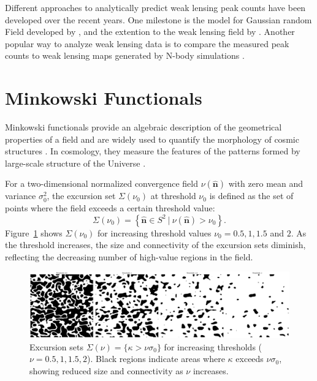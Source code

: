 Different approaches to analytically predict weak lensing peak counts have been developed over the recent years. One milestone is the model for Gaussian random Field developed by \citet{1986ApJ...304...15B}, and the extention to the weak lensing field by \citet{2010A&A...519A..23M}. Another popular way to analyze weak lensing data is to compare the measured peak counts to weak lensing maps generated by N-body simulations \citep{2010PhRvD..81h3505M, 2016MNRAS.463.3653K, 2018MNRAS.474..712M, 2021JCAP...01..028Z}.

\section{Minkowski Functionals}
\label{sec:minkowski_functionals}
Minkowski functionals provide an algebraic description of the geometrical properties of a field and are widely used to quantify the morphology of cosmic structures \citep{1994A&A...288..697M}. In cosmology,  they measure the features of the patterns formed by large-scale structure of the Universe \citep{1996dmu..conf..281S, 1997ApJ...482L...1S}.

For a two-dimensional normalized convergence field $\nu(\hat{\mathbf{n}})$ with zero mean and variance $\sigma_0^2$, the excursion set $\Sigma(\nu_0)$ at threshold $\nu_0$ is defined as the set of points where the field exceeds a certain threshold value:
\begin{equation}
    \Sigma(\nu_0) = \left\{ \hat{\mathbf{n}} \in S^2 \ \bigg| \ \nu(\hat{\mathbf{n}}) > \nu_0 \right\}.
\end{equation}
Figure~\ref{fig:excursion_sets} shows $\Sigma(\nu_0)$ for increasing threshold values $\nu_0 = 0.5, 1, 1.5$ and $2$. As the threshold increases, the size and connectivity of the excursion sets diminish, reflecting the decreasing number of high-value regions in the field.
\begin{figure}[ht]
    \centering
    \includegraphics[width=\textwidth]{figures/threshold_comparison.png}
    \caption[Excursion sets of different thresholds]{Excursion sets $\Sigma(\nu) = \{ \kappa > \nu \sigma_0 \}$ for increasing thresholds ($\nu = 0.5, 1, 1.5, 2$). Black regions indicate areas where $\kappa$ exceeds $\nu \sigma_0$, showing reduced size and connectivity as $\nu$ increases.}
    \label{fig:excursion_sets}
\end{figure}

